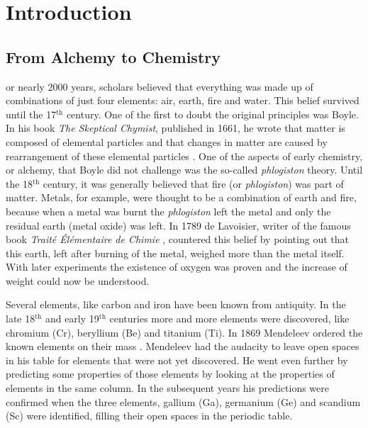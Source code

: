 \chapter{Introduction}
\label{chap_intro}


\newpage

\section{\label{ch1.sec.history1}From Alchemy to Chemistry}

\lettrine{}{}or nearly 2000 years, scholars believed that everything was made up of combinations of just four elements: air, earth, fire and water. This belief survived until the 17$^\mathrm{th}$ century. One of the first to doubt the original principles was Boyle. In his book \textit{The Skeptical Chymist}, published in 1661, he wrote that matter is composed of elemental particles and that changes in matter are caused by rearrangement of these elemental particles \cite{boyle}. One of the aspects of early chemistry, or alchemy, that Boyle did not challenge was the so-called \textit{phlogiston} theory. Until the 18$^\mathrm{th}$ century, it was generally believed that fire (or \textit{phlogiston}) was part of matter. Metals, for example, were thought to be a combination of earth and fire, because when a metal was burnt the \textit{phlogiston} left the metal and only the residual earth (metal oxide) was left. In 1789 de Lavoisier, writer of the famous book \textit{Trait\'e \'El\'ementaire de Chimie} \cite{lavoisier}, countered this belief by pointing out that this earth, left after burning of the metal, weighed more than the metal itself. With later experiments the existence of oxygen was proven and the increase of weight could now be understood.

Several elements, like carbon and iron have been known from antiquity. In the late 18$^\mathrm{th}$ and early 19$^\mathrm{th}$ centuries more and more elements were discovered, like chromium (Cr), beryllium (Be) and titanium (Ti).  In 1869 Mendeleev ordered the known elements on their mass \cite{mendeleev}. Mendeleev had the audacity to leave open spaces in his table for elements that were not yet discovered. He went even further by predicting some properties of those elements by looking at the properties of elements in the same column. In the subsequent years his predictions were confirmed when the three elements, gallium (Ga), germanium (Ge) and scandium (Sc) were identified, filling their open spaces in the periodic table.

